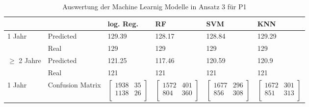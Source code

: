 \begin{table}[ht]
  \caption{\label{tab:ergebnisA3P1} Auswertung der Machine Learnig Modelle in Ansatz 3 f\"ur P1}
  \begin{tabular}{ p{2cm} p{2cm} p{2cm} p{2cm} p{2cm} p{2cm} }
    \toprule
                   &                  & log. Reg.                                  & RF                                         & SVM                                        & KNN                                        \\
    \midrule
    \multirow{2}{3em}{1 Jahr}
                   & Predicted        & 129.39                                     & 128.17                                     & 128.84                                     & 129.29                                     \\
                   & Real             & 129                                        & 129                                        & 129                                        & 129                                        \\

    \multirow{2}{2.5cm}{$\geq$ 2 Jahre}
                   & Predicted        & 121.25                                     & 117.46                                     & 120.59                                     & 120.9                                      \\
                   & Real             & 121                                        & 121                                        & 121                                        & 121                                        \\
    \midrule

    1 Jahr         & Confusion Matrix & $\left[ \begin{array}{rr} 1938 & 35  \\  1138 & 26 \\  \end{array}\right]$  & $\left[ \begin{array}{rr} 1572 & 401  \\  804 & 360 \\  \end{array}\right]$  & $\left[ \begin{array}{rr} 1677 & 296  \\  856 & 308 \\  \end{array}\right]$  & $\left[ \begin{array}{rr} 1672 & 301  \\  851 & 313 \\  \end{array}\right]$ \\


\end{tabular}
\end{table}
